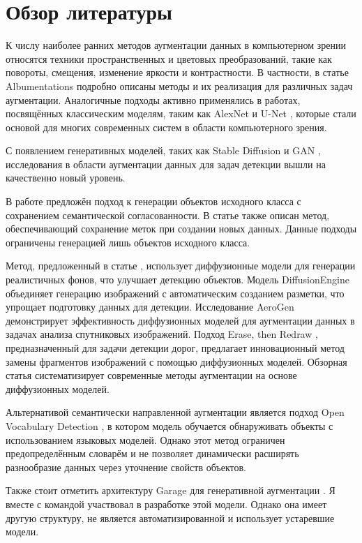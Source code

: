 \section{Обзор литературы}
К числу наиболее ранних методов аугментации данных в компьютерном зрении относятся техники пространственных и цветовых преобразований, такие как повороты, смещения, изменение яркости и контрастности. В частности, в статье Albumentations \cite{DBLP:journals/corr/abs-1809-06839} подробно описаны методы и их реализация для различных задач аугментации. Аналогичные подходы активно применялись в работах, посвящённых классическим моделям, таким как AlexNet \cite{NIPS2012_c399862d} и U-Net \cite{DBLP:journals/corr/RonnebergerFB15}, которые стали основой для многих современных систем в области компьютерного зрения.

С появлением генеративных моделей, таких как Stable Diffusion   \cite{DBLP:journals/corr/abs-2112-10752} и GAN  \cite{goodfellow2014generativeadversarialnetworks}, исследования в области аугментации данных для задач детекции вышли на качественно новый уровень.

В работе \cite{10484172} предложён подход к генерации объектов исходного класса с сохранением семантической согласованности. В статье \cite{kupyn2024datasetenhancementinstancelevelaugmentations} также описан метод, обеспечивающий сохранение меток при создании новых данных. Данные подходы  ограничены генерацией лишь объектов исходного класса.


Метод, предложенный в статье \cite{li2024simplebackgroundaugmentationmethod}, использует диффузионные модели для генерации реалистичных фонов, что улучшает детекцию объектов. 
 Модель DiffusionEngine \cite{zhang2023diffusionenginediffusionmodelscalable} объединяет генерацию изображений с автоматическим созданием разметки, что упрощает подготовку данных для детекции. Исследование AeroGen \cite{tang2025aerogenenhancingremotesensing} демонстрирует эффективность диффузионных моделей для аугментации данных в задачах анализа спутниковых изображений. Подход Erase, then Redraw \cite{ma2025eraseredrawnoveldata}, предназначенный для задачи детекции дорог, предлагает инновационный метод замены фрагментов изображений с помощью диффузионных моделей.
Обзорная статья \cite{alimisis2025advancesdiffusionmodelsimage} систематизирует современные методы аугментации на основе диффузионных моделей.

Альтернативой семантически направленной аугментации является подход Open Vocabulary Detection \cite{zhu2024surveyopenvocabularydetectionsegmentation}, в котором модель обучается обнаруживать объекты с использованием языковых моделей. Однако этот метод ограничен предопределённым словарём и не позволяет динамически расширять разнообразие данных через уточнение свойств объектов.

Также стоит отметить архитектуру Garage для генеративной аугментации \cite{Garage2024}. Я вместе с командой участвовал в разработке этой модели. Однако она  имеет другую структуру, не является автоматизированной и  использует устаревшие модели.


